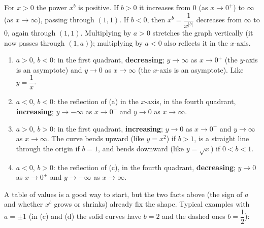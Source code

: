 For $x>0$ the power $x^{b}$ is positive. If $b>0$ it increases from $0$ (as $x\to0^+$) to $\infty$ (as $x\to\infty$), passing through $(1,1)$. If $b<0$, then $x^{b}=\dfrac{1}{x^{|b|}}$ decreases from $\infty$ to $0$, again through $(1,1)$. Multiplying by $a>0$ stretches the graph vertically (it now passes through $(1,a)$); multiplying by $a<0$ also reflects it in the $x$-axis.
\begin{enumerate}
\item[(a)] $a>0$, $b<0$: in the first quadrant, \textbf{decreasing}; $y\to\infty$ as $x\to0^+$ (the $y$-axis is an asymptote) and $y\to0$ as $x\to\infty$ (the $x$-axis is an asymptote). Like $y=\dfrac{1}{x}$.
\item[(b)] $a<0$, $b<0$: the reflection of (a) in the $x$-axis, in the fourth quadrant, \textbf{increasing}; $y\to-\infty$ as $x\to0^+$ and $y\to0$ as $x\to\infty$.
\item[(c)] $a>0$, $b>0$: in the first quadrant, \textbf{increasing}; $y\to0$ as $x\to0^+$ and $y\to\infty$ as $x\to\infty$. The curve bends upward (like $y=x^2$) if $b>1$, is a straight line through the origin if $b=1$, and bends downward (like $y=\sqrt x$) if $0<b<1$.
\item[(d)] $a<0$, $b>0$: the reflection of (c), in the fourth quadrant, \textbf{decreasing}; $y\to0$ as $x\to0^+$ and $y\to-\infty$ as $x\to\infty$.
\end{enumerate}
A table of values is a good way to start, but the two facts above (the sign of $a$ and whether $x^{b}$ grows or shrinks) already fix the shape. Typical examples with $a=\pm1$ (in (c) and (d) the solid curves have $b=2$ and the dashed ones $b=\dfrac{1}{2}$):

